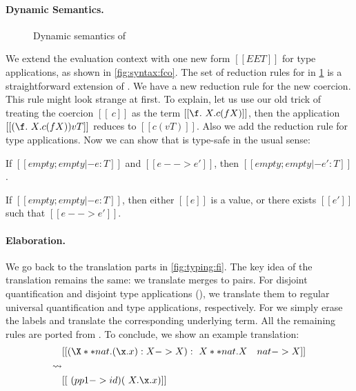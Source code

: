 \paragraph{\tnamee Dynamic Semantics.}


\begin{figure}[t]
  \centering
  \caption{Dynamic semantics of \tnamee}
  \label{fig:red:fi}
\end{figure}


We extend the evaluation context with one new form $[[EE T]]$ for type
applications, as shown in \cref{fig:syntax:fco}. The set of reduction rules for \tnamee in \cref{fig:red:fi}
is a straightforward extension of \tname. We
have a new reduction rule  for the new coercion. This rule might look
strange at first. To explain, let us use our old trick of treating the coercion
$[[\ c]]$ as the term $[[ \f . \ X . c (f X) ]]$, then the application
$[[(\f . \ X . c (f X)) v T ]]$ reduces to $[[ c (v T) ]]$. Also we add the
reduction rule  for type applications. Now we can show that
\tnamee is type-safe in the usual sense:

\begin{theorem}
  If $[[empty; empty |- e : T]]$ and $[[e --> e']]$, then $[[empty; empty |- e' : T]]$.
\end{theorem}

\begin{theorem}
  If $[[empty; empty |- e : T]]$, then either $[[e]]$ is a value, or there exists $[[e']]$ such
  that $[[e --> e']]$.
\end{theorem}


\paragraph{Elaboration.}

We go back to the translation parts in \cref{fig:typing:fi}. The key idea of the
translation remains the same: we translate merges to pairs. For disjoint
quantification and disjoint type applications (), we
translate them to regular universal quantification and type applications,
respectively. For  we simply erase
the labels and translate the corresponding underlying term. All the remaining
rules are ported from \namee. To conclude, we show an example translation:
\begin{align*}
  & [[ (\X ** nat . (\x . x) : X -> X)  : \ X ** nat . X & nat -> X ]] \\
  \rightsquigarrow & \\
  & [[\ (pp1 -> id)  (\ X . \x . x)]]
\end{align*}

